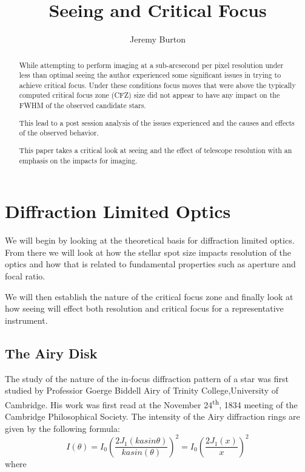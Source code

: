 \documentclass[11pt]{article}
\begin{document}
\title{Seeing and Critical Focus}
\author{Jeremy Burton}


\maketitle

\begin{abstract}
\setlength{\parindent}{0em}
\setlength{\parskip}{1em}

While attempting to perform imaging at a sub-arcsecond per pixel resolution under less than optimal seeing the author experienced some significant issues in trying to achieve critical focus.  Under these conditions focus moves that were above the typically computed critical focus zone (CFZ) size did not appear to have any impact on the FWHM of the observed candidate stars.

This lead to a post session analysis of the issues experienced and the causes and effects of the observed behavior.  

This paper takes a critical look at seeing and the effect of telescope resolution with an emphasis on the impacts for imaging.

\end{abstract}
\newpage

\tableofcontents
\newpage

\section{Diffraction Limited Optics}

We will begin by looking at the theoretical basis for diffraction limited optics. From there we will look at how the stellar spot size impacts resolution of the optics and how that is related to fundamental properties such as aperture and focal ratio.

We will then establish the nature of the critical focus zone and finally look at how seeing will effect both resolution and critical focus for a representative instrument.

\subsection{The Airy Disk}

The study of the nature of the in-focus diffraction pattern of a star was first studied by Professior Goerge Biddell Airy of Trinity College,University of Cambridge.   His work was first read at the November 24\textsuperscript{th}, 1834 meeting of the Cambridge Philosophical Society.
The intensity of the Airy diffraction rings are given by the following formula:
\Large
\begin{equation}
\label{eqn:bessel-1}
I(\theta) = I_{0}\left(\frac{2J_{1}(kasin\theta)}{kasin(\theta)}\right)^{2} = I_{0}\left(\frac{2J_{1}(x)}{x}\right)^{2}
\end{equation}
\large
where 
\end{document}
